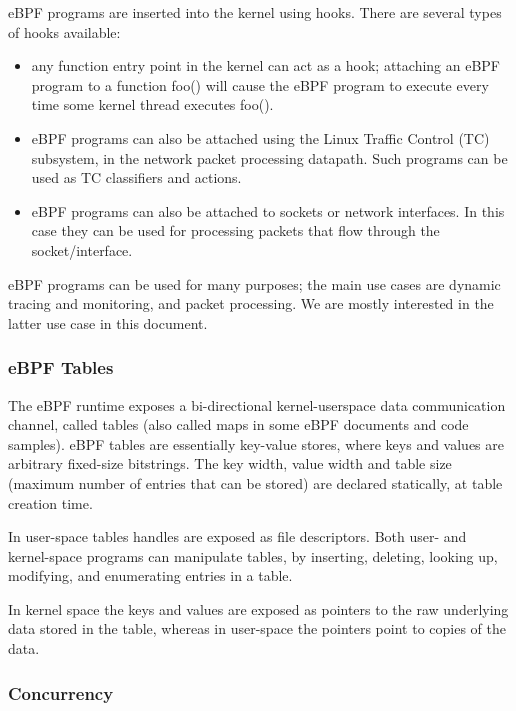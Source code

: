 eBPF programs are inserted into the kernel using hooks. There are
several types of hooks available:

\begin{itemize}
\item any function entry point in the kernel can act as a hook;
  attaching an eBPF program to a function foo() will cause the eBPF
  program to execute every time some kernel thread executes foo().

\item eBPF programs can also be attached using the Linux Traffic
  Control (TC) subsystem, in the network packet processing
  datapath. Such programs can be used as TC classifiers and actions.

\item eBPF programs can also be attached to sockets or network
  interfaces. In this case they can be used for processing packets
  that flow through the socket/interface.
\end{itemize}

eBPF programs can be used for many purposes; the main use cases are
dynamic tracing and monitoring, and packet processing.  We are mostly
interested in the latter use case in this document.

\subsubsection{eBPF Tables}

The eBPF runtime exposes a bi-directional kernel-userspace data
communication channel, called tables (also called maps in some eBPF
documents and code samples). eBPF tables are essentially key-value
stores, where keys and values are arbitrary fixed-size bitstrings. The
key width, value width and table size (maximum number of entries that
can be stored) are declared statically, at table creation time.

In user-space tables handles are exposed as file descriptors. Both
user- and kernel-space programs can manipulate tables, by inserting,
deleting, looking up, modifying, and enumerating entries in a table.

In kernel space the keys and values are exposed as pointers to the raw
underlying data stored in the table, whereas in user-space the
pointers point to copies of the data.

\subsubsection{Concurrency}

